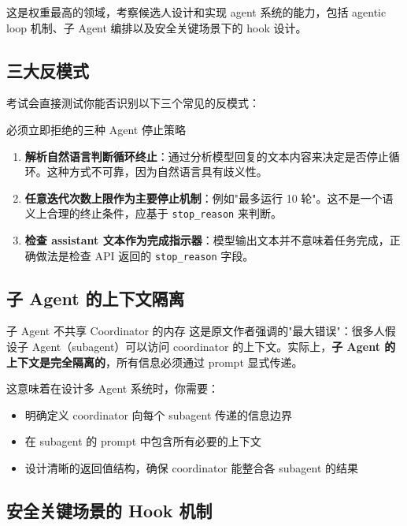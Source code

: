 \documentclass[a4paper]{article}
\begin{document}
这是权重最高的领域，考察候选人设计和实现 agent 系统的能力，包括 agentic loop 机制、子 Agent 编排以及安全关键场景下的 hook 设计。

\subsection{三大反模式}

考试会直接测试你能否识别以下三个常见的反模式：

\begin{warningbox}{必须立即拒绝的三种 Agent 停止策略}
\begin{enumerate}[leftmargin=1.5em]
    \item \textbf{解析自然语言判断循环终止}：通过分析模型回复的文本内容来决定是否停止循环。这种方式不可靠，因为自然语言具有歧义性。
    \item \textbf{任意迭代次数上限作为主要停止机制}：例如"最多运行 10 轮"。这不是一个语义上合理的终止条件，应基于 \texttt{stop\_reason} 来判断。
    \item \textbf{检查 assistant 文本作为完成指示器}：模型输出文本并不意味着任务完成，正确做法是检查 API 返回的 \texttt{stop\_reason} 字段。
\end{enumerate}
\end{warningbox}

\subsection{子 Agent 的上下文隔离}

\begin{importantbox}{子 Agent 不共享 Coordinator 的内存}
这是原文作者强调的"最大错误"：很多人假设子 Agent（subagent）可以访问 coordinator 的上下文。实际上，\textbf{子 Agent 的上下文是完全隔离的}，所有信息必须通过 prompt 显式传递。
\end{importantbox}

这意味着在设计多 Agent 系统时，你需要：
\begin{itemize}[leftmargin=1.5em]
    \item 明确定义 coordinator 向每个 subagent 传递的信息边界
    \item 在 subagent 的 prompt 中包含所有必要的上下文
    \item 设计清晰的返回值结构，确保 coordinator 能整合各 subagent 的结果
\end{itemize}

\subsection{安全关键场景的 Hook 机制}
\end{document}
